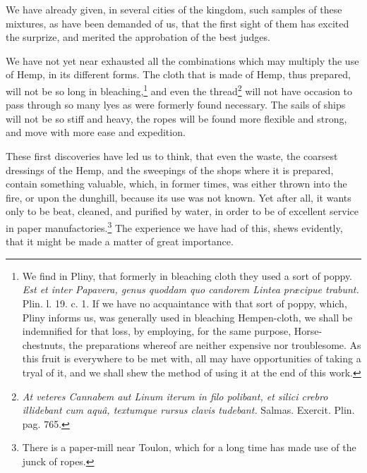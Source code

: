 \documentclass[a4paper, 11pt, oneside, polutonikogreek, english]{article}
\begin{document}
We have already given, in several cities of the kingdom, such samples of these mixtures, as have been demanded of us, that the first sight of them has excited the surprize, and merited the approbation of the best judges.

We have not yet near exhausted all the combinations which may multiply the use of Hemp, in its different forms. The cloth that is made of Hemp, thus prepared, will not be so long in bleaching,\footnote{We find in Pliny, that formerly in bleaching cloth they used a sort of poppy. \emph{Est et inter Papavera, genus quoddam quo candorem Lintea præcipue trabunt.} Plin. l. 19. c. 1. If we have no acquaintance with that sort of poppy, which, Pliny informs us, was generally used in bleaching Hempen-cloth, we shall be indemnified for that loss, by employing, for the same purpose, Horse-chestnuts, the preparations whereof are neither expensive nor troublesome. As this fruit is everywhere to be met with, all may have opportunities of taking a tryal of it, and we shall shew the method of using it at the end of this work.} and even the thread\footnote{\emph{At veteres Cannabem aut Linum iterum in filo polibant, et silici crebro illidebant cum aquâ, textumque rursus clavis tudebant.} Salmas. Exercit. Plin. pag. 765.} will not have occasion to pass through so many lyes as were formerly found necessary. The sails of ships will not be so stiff and heavy, the ropes will be found more flexible and strong, and move with more ease and expedition.

These first discoveries have led us to think, that even the waste, the coarsest dressings of the Hemp, and the sweepings of the shops where it is prepared, contain something valuable, which, in former times, was either thrown into the fire, or upon the dunghill, because its use was not known. Yet after all, it wants only to be beat, cleaned, and purified by water, in order to be of excellent service in paper manufactories.\footnote{There is a paper-mill near Toulon, which for a long time has made use of the junck of ropes.} The experience we have had of this, shews evidently, that it might be made a matter of great importance.
\end{document}
